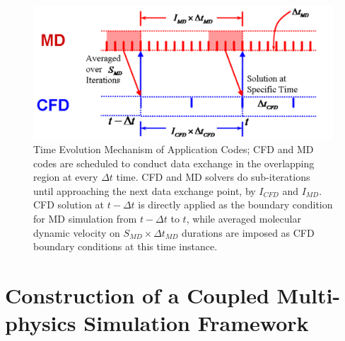 \documentclass[conference,final]{IEEEtran}
\begin{document}
\begin{figure}[ht]
\centering
\includegraphics[width=1.0\linewidth]{Hybrid_Flowchart_1.pdf}
\vskip-0.2cm
\caption{\small Time Evolution Mechanism of Application Codes; CFD and MD codes are scheduled to conduct data exchange in the overlapping region at every $\Delta{t}$ time. CFD and MD solvers do sub-iterations until approaching the next data exchange point, by $I_{CFD}$ and $I_{MD}$. CFD solution at $t-\Delta{t}$ is directly applied as the boundary condition for MD simulation from $t-\Delta{t}$ to $t$, while averaged molecular dynamic velocity on $S_{MD}\times\Delta{t_{MD}}$ durations are imposed as CFD boundary conditions at this time instance.}
\label{Hybrid_Timescale}
\end{figure}




%



\section{Construction of a Coupled Multi-physics Simulation Framework}
\end{document}
